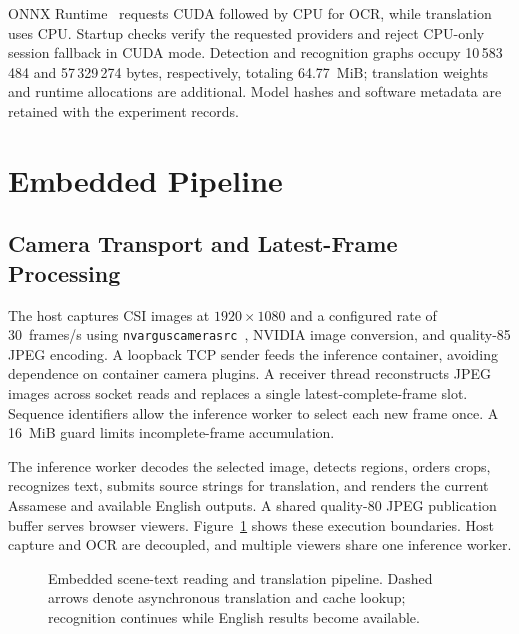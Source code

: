 \documentclass[cspaper,journal,10pt]{IEEEtran}
\begin{document}
ONNX Runtime~\cite{ort} requests CUDA followed by CPU for OCR, while translation uses CPU. Startup checks verify the requested providers and reject CPU-only session fallback in CUDA mode. Detection and recognition graphs occupy 10\,583\,484 and 57\,329\,274 bytes, respectively, totaling 64.77~MiB; translation weights and runtime allocations are additional. Model hashes and software metadata are retained with the experiment records.

\section{Embedded Pipeline}
\subsection{Camera Transport and Latest-Frame Processing}
The host captures CSI images at $1920\times1080$ and a configured rate of 30~frames/s using \texttt{nvarguscamerasrc}~\cite{jetson}, NVIDIA image conversion, and quality-85 JPEG encoding. A loopback TCP sender feeds the inference container, avoiding dependence on container camera plugins. A receiver thread reconstructs JPEG images across socket reads and replaces a single latest-complete-frame slot. Sequence identifiers allow the inference worker to select each new frame once. A 16~MiB guard limits incomplete-frame accumulation.

The inference worker decodes the selected image, detects regions, orders crops, recognizes text, submits source strings for translation, and renders the current Assamese and available English outputs. A shared quality-80 JPEG publication buffer serves browser viewers. Figure~\ref{fig:architecture} shows these execution boundaries. Host capture and OCR are decoupled, and multiple viewers share one inference worker.

\begin{figure}[!t]
\centering

\caption{Embedded scene-text reading and translation pipeline. Dashed arrows denote asynchronous translation and cache lookup; recognition continues while English results become available.}
\label{fig:architecture}
\end{figure}
\end{document}
